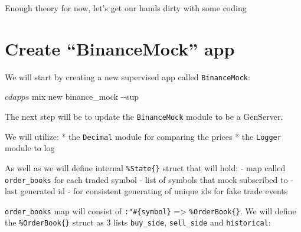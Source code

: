 \documentclass[
  oneside]{book}
\newenvironment{Shaded}{\begin{snugshade}}{\end{snugshade}}
\newcommand{\AttributeTok}[1]{\textcolor[rgb]{0.77,0.63,0.00}{#1}}
\newcommand{\ExtensionTok}[1]{#1}
\newcommand{\NormalTok}[1]{#1}
\begin{document}
Enough theory for now, let's get our hands dirty with some coding

\hypertarget{create-binancemock-app}{%
\section{Create ``BinanceMock'' app}\label{create-binancemock-app}}

We will start by creating a new supervised app called \texttt{BinanceMock}:

\begin{Shaded}
\begin{Highlighting}[]
\ExtensionTok{$}\NormalTok{ cd apps}
\ExtensionTok{$}\NormalTok{ mix new binance\_mock }\AttributeTok{{-}{-}sup}
\end{Highlighting}
\end{Shaded}

The next step will be to update the \texttt{BinanceMock} module to be a GenServer.

We will utilize:
* the \texttt{Decimal} module for comparing the prices
* the \texttt{Logger} module to log

As well as we will define internal \texttt{\%State\{\}} struct that will hold:
- map called \texttt{order\_books} for each traded symbol
- list of symbols that mock subscribed to
- last generated id - for consistent generating of unique ids for fake trade events

\texttt{order\_books} map will consist of \texttt{:"\#\{symbol\}} =\textgreater{} \texttt{\%OrderBook\{\}}. We will define the \texttt{\%OrderBook\{\}} struct as 3 lists \texttt{buy\_side}, \texttt{sell\_side} and \texttt{historical}:
\end{document}
